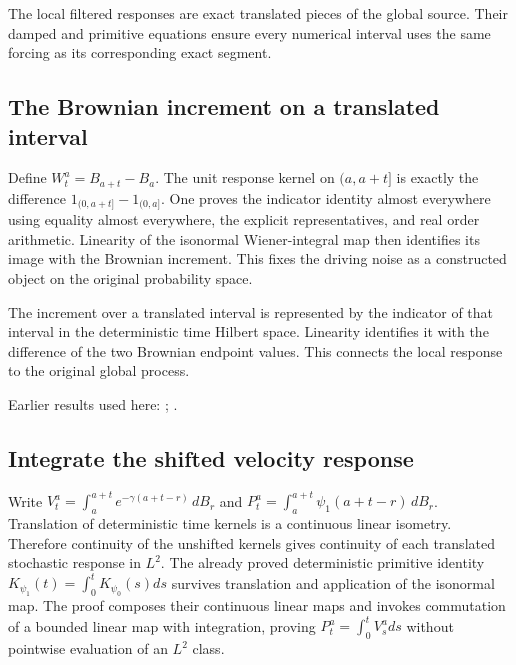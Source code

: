 \documentclass[11pt,a4paper]{report}
\begin{document}
The local filtered responses are exact translated pieces of the global source. Their damped and primitive equations ensure every numerical interval uses the same forcing as its corresponding exact segment.

\subsection{\texorpdfstring{The Brownian increment on a translated interval}{The Brownian increment on a translated interval}}
\label{report-step-KineticLangevin-BrownianSegmentEquations-lean-1}


Define \(W^a_t=B_{a+t}-B_a\). The unit response kernel on \((a,a+t]\) is exactly the difference \(1_{(0,a+t]}-1_{(0,a]}\). One proves the indicator identity almost everywhere using equality almost everywhere, the explicit representatives, and real order arithmetic. Linearity of the isonormal Wiener-integral map then identifies its image with the Brownian increment. This fixes the driving noise as a constructed object on the original probability space.



The increment over a translated interval is represented by the indicator of that interval in the deterministic time Hilbert space. Linearity identifies it with the difference of the two Brownian endpoint values. This connects the local response to the original global process.



Earlier results used here: \cite[Section~3.8.2]{LangevinLean2026ULASC}; \cite[Section~3.8.9]{LangevinLean2026ULASC}.
\subsection{\texorpdfstring{Integrate the shifted velocity response}{Integrate the shifted velocity response}}
\label{report-step-KineticLangevin-BrownianSegmentEquations-lean-2}


Write \(V^a_t=\int_a^{a+t}e^{-\gamma(a+t-r)}\,dB_r\) and \(P^a_t=\int_a^{a+t}\psi_1(a+t-r)\,dB_r\). Translation of deterministic time kernels is a continuous linear isometry. Therefore continuity of the unshifted kernels gives continuity of each translated stochastic response in \(L^{2}\). The already proved deterministic primitive identity \(K_{\psi_1}(t)=\int_0^tK_{\psi_0}(s)ds\) survives translation and application of the isonormal map. The proof composes their continuous linear maps and invokes commutation of a bounded linear map with integration, proving \(P^a_t=\int_0^tV^a_sds\) without pointwise evaluation of an \(L^{2}\) class.
\end{document}
